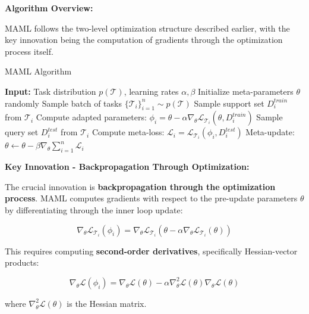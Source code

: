 \documentclass[12pt]{article}
\newcommand{\ieee}[1]{\textcolor{IEEEBlue}{\textbf{#1}}}
\newcommand{\highlight}[1]{\textcolor{IEEERed}{\textbf{#1}}}
\begin{document}
{{			\ieee{Algorithm Overview:}
			
			MAML follows the two-level optimization structure described earlier, with the key innovation being the computation of gradients through the optimization process itself.
			
			\begin{algorithm}[H]
			\caption{MAML Algorithm}
			\begin{algorithmic}[1]
			\STATE \textbf{Input:} Task distribution $p(\mathcal{T})$, learning rates $\alpha, \beta$
			\STATE Initialize meta-parameters $\theta$ randomly
			\STATE Sample batch of tasks $\{\mathcal{T}_i\}_{i=1}^n \sim p(\mathcal{T})$
			\STATE Sample support set $D_i^{train}$ from $\mathcal{T}_i$
			\STATE Compute adapted parameters: $\phi_i = \theta - \alpha\nabla_\theta \mathcal{L}_{\mathcal{T}_i}(\theta, D_i^{train})$
			\STATE Sample query set $D_i^{test}$ from $\mathcal{T}_i$
			\STATE Compute meta-loss: $\mathcal{L}_i = \mathcal{L}_{\mathcal{T}_i}(\phi_i, D_i^{test})$
			\ENDFOR
			\STATE Meta-update: $\theta \leftarrow \theta - \beta\nabla_\theta \sum_{i=1}^n \mathcal{L}_i$
			\ENDWHILE
			\end{algorithmic}
			\end{algorithm}
			
			\ieee{Key Innovation - Backpropagation Through Optimization:}
			
			The crucial innovation is \highlight{backpropagation through the optimization process}. MAML computes gradients with respect to the pre-update parameters $\theta$ by differentiating through the inner loop update:
			
			\begin{equation}
			\nabla_\theta \mathcal{L}_{\mathcal{T}_i}(\phi_i) = \nabla_\theta \mathcal{L}_{\mathcal{T}_i}(\theta - \alpha \nabla_\theta \mathcal{L}_{\mathcal{T}_i}(\theta))
			\end{equation}
			
			This requires computing \textbf{second-order derivatives}, specifically Hessian-vector products:
			
			\begin{equation}
			\nabla_\theta \mathcal{L}(\phi_i) = \nabla_\theta \mathcal{L}(\theta) - \alpha \nabla^2_\theta \mathcal{L}(\theta) \nabla_\theta \mathcal{L}(\theta)
			\end{equation}
			
			where $\nabla^2_\theta \mathcal{L}(\theta)$ is the Hessian matrix.
			
}}
\end{document}
